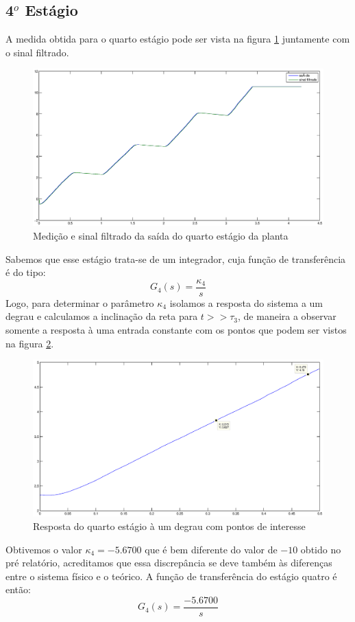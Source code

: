 \documentclass{article}
\begin{document}
\subsection{4$^o$ Estágio}
A medida obtida para o quarto estágio pode ser vista na figura \ref{fig:saida4} juntamente com o sinal filtrado.
\begin{figure}[H]
	\centering
	\includegraphics[width=\linewidth]{saida4}
	\caption{Medição e sinal filtrado da saída do quarto estágio da planta}
	\label{fig:saida4}
\end{figure}
Sabemos que esse estágio trata-se de um integrador, cuja função de transferência é do tipo:
\begin{equation}
\label{eq:gs4}
G_4(s) = \frac{\kappa_4}{s}
\end{equation}
Logo, para determinar o parâmetro $\kappa_4$ isolamos a resposta do sistema a um degrau e calculamos a inclinação da reta para $t >> \tau_3$, de maneira a observar somente a resposta à uma entrada constante com os pontos que podem ser vistos na figura \ref{fig:4seila}. 
\begin{figure}[H]
	\centering
	\includegraphics[width=\linewidth]{4seila}
	\caption{Resposta do quarto estágio à um degrau com pontos de interesse}
	\label{fig:4seila}
\end{figure}
Obtivemos o valor $\kappa_4 = -5.6700$ que é bem diferente do valor de $-10$ obtido no pré relatório, acreditamos que essa discrepância se deve também às diferenças entre o sistema físico e o teórico. A função de transferência do estágio quatro é então:
\begin{equation}
\label{eq:g4}
G_4(s) = \frac{-5.6700}{s}
\end{equation} 
\end{document}
